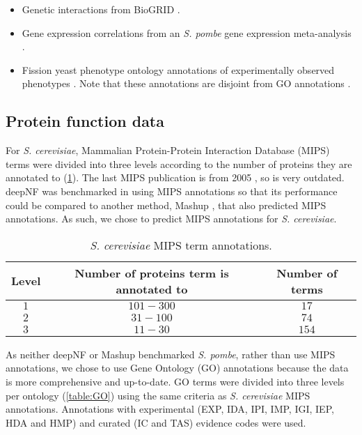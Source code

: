 \begin{itemize}
    \item Genetic interactions from BioGRID \cite{Oughtred2018}.
    \item Gene expression correlations from an \emph{S. pombe} gene expression meta-analysis \cite{Pancaldi2010}.
    \item Fission yeast phenotype ontology annotations of experimentally observed phenotypes \cite{Harris2013}. Note that these annotations are disjoint from GO annotations \cite{Carbon2018}.
\end{itemize}


\subsection{Protein function data}

For \emph{S. cerevisiae}, Mammalian Protein-Protein Interaction Database (MIPS) terms \cite{Pagel2005; Ruepp2004} were divided into three levels according to the number of proteins they are annotated to (\ref{table:MIPS}).
The last MIPS publication is from 2005 \cite{Pagel2005}, so is very outdated.
deepNF was benchmarked in \cite{Gligorijevic2018} using MIPS annotations so that its performance could be compared to another method, Mashup \cite{Cho2016}, that also predicted MIPS annotations.
As such, we chose to predict MIPS annotations for \emph{S. cerevisiae}.

\begin{table}[ht!]
    \centering
    \caption{%
        \emph{S. cerevisiae} MIPS term annotations.
    }
    \label{table:MIPS}
    \begin{tabular}{ccc}
        \toprule
        \textbf{Level} & \textbf{Number of proteins term is annotated to} & \textbf{Number of terms} \\
        \midrule
        $1$ & $101-300$ & $17$ \\
        $2$ & $31-100$ & $74$ \\
        $3$ & $11-30$ & $154$ \\
        \bottomrule
    \end{tabular}
\end{table}

As neither deepNF or Mashup benchmarked \emph{S. pombe}, rather than use MIPS annotations, we chose to use Gene Ontology (GO) annotations because the data is more comprehensive and up-to-date.
GO terms were divided into three levels per ontology (\ref{table:GO}) using the same criteria as \emph{S. cerevisiae} MIPS annotations.
Annotations with experimental (EXP, IDA, IPI, IMP, IGI, IEP, HDA and HMP) and curated (IC and TAS) evidence codes were used.


